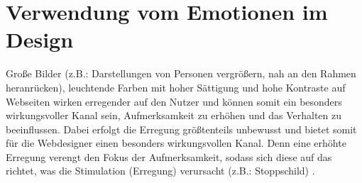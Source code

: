 \documentclass[./dokumentation.tex]{subfiles}
\begin{document}
\section{Verwendung vom Emotionen im Design}
Große Bilder (z.B.: Darstellungen von Personen vergrößern, nah an den Rahmen heranrücken), leuchtende Farben mit hoher Sättigung und hohe Kontraste auf Webseiten wirken erregender auf den Nutzer und können somit ein besonders wirkungsvoller Kanal sein, Aufmerksamkeit zu erhöhen und das Verhalten zu beeinflussen. Dabei erfolgt die Erregung größtenteils unbewusst und bietet somit für die Webdesigner einen besonders wirkungsvollen Kanal. Denn eine erhöhte Erregung verengt den Fokus der Aufmerksamkeit, sodass sich diese auf das richtet,  was die Stimulation (Erregung) verursacht (z.B.: Stoppschild) \cite{vanGorp2013}. 
\end{document}
